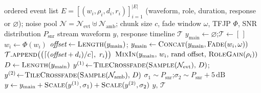 \documentclass{article}
\begin{document}
\begin{algorithm}[H]
\caption{Dual-Track Streaming Sequence Composition}
\label{alg:compose}
\begin{algorithmic}[1]
\Require ordered event list 
         $E\!=\![(w_i, \rho_i, d_i, r_i)]_{i=1}^{|E|}$ 
         (waveform, role, duration, response or $\varnothing$); 
         noise pool 
         $\mathcal{N}\!=\!\mathcal{N}_{\text{evt}}\uplus\mathcal{N}_{\text{amb}}$;
         chunk size $c$, fade window $\omega$, TFJP $\Phi$, 
         SNR distribution $P_{\text{snr}}$
\Ensure  stream waveform $y$, response timeline $\mathcal{T}$
\State $y_{\text{main}}\!\gets\!\varnothing$;\quad $\mathcal{T}\!\gets\![\,]$
    \State $w_i \gets \Phi(w_i)$  
        \State $\textit{offset} \gets \textsc{Length}(y_{\text{main}})$;\quad
               $y_{\text{main}} \gets \textsc{Concat}(y_{\text{main}},\textsc{Fade}(w_i,\omega))$
            \State $\mathcal{T}.\textsc{append}\big(\big(\lceil(\textit{offset}+d_i)/c\rceil,\ r_i\big)\big)$
        \EndIf
    \Else                                  {}
        \State $\textsc{MixIn}(y_{\text{main}},\,w_i,\,
               \text{rand offset},\,\textsc{RoleGain}(\rho_i))$
    \EndIf
\EndFor
\State $D \gets \textsc{Length}(y_{\text{main}})$
\State $y^{(1)}\!\gets\!\textsc{TileCrossfade}(\textsc{Sample}(\mathcal{N}_{\text{evt}}),\,D)$;\quad 
       $y^{(2)}\!\gets\!\textsc{TileCrossfade}(\textsc{Sample}(\mathcal{N}_{\text{amb}}),\,D)$
\State $\sigma_1 \sim P_{\text{snr}}$;\quad $\sigma_2 \sim P_{\text{snr}}+5\,\text{dB}$
\State $y \gets y_{\text{main}} 
              + \textsc{Scale}(y^{(1)},\sigma_1) 
              + \textsc{Scale}(y^{(2)},\sigma_2)$
\State \Return $y,\,\mathcal{T}$
\end{algorithmic}
\end{algorithm}

\newpage
\end{document}
